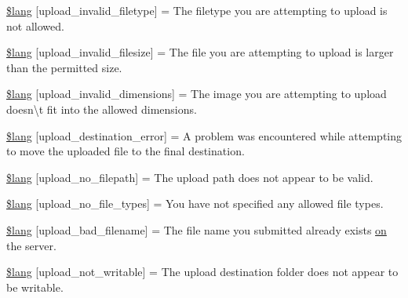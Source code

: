 \begin{DoxyCompactItemize}
\item 
\hyperlink{upload__lang_8php_ac8631aa85ed80396bd78e91a76d5fd38}{\$lang} \mbox{[}\textquotesingle{}upload\+\_\+invalid\+\_\+filetype\textquotesingle{}\mbox{]} = \textquotesingle{}The filetype you are attempting to upload is not allowed.\textquotesingle{}
\item 
\hyperlink{upload__lang_8php_a832b3ec1d84b1d48a488cf525954d8f2}{\$lang} \mbox{[}\textquotesingle{}upload\+\_\+invalid\+\_\+filesize\textquotesingle{}\mbox{]} = \textquotesingle{}The file you are attempting to upload is larger than the permitted size.\textquotesingle{}
\item 
\hyperlink{upload__lang_8php_a4e796eeccf7df90acffea7884a5bd558}{\$lang} \mbox{[}\textquotesingle{}upload\+\_\+invalid\+\_\+dimensions\textquotesingle{}\mbox{]} = \textquotesingle{}The image you are attempting to upload doesn\textbackslash{}\textquotesingle{}t fit into the allowed dimensions.\textquotesingle{}
\item 
\hyperlink{upload__lang_8php_a31be70c748b9bfc43dd7468e1fa64c42}{\$lang} \mbox{[}\textquotesingle{}upload\+\_\+destination\+\_\+error\textquotesingle{}\mbox{]} = \textquotesingle{}A problem was encountered while attempting to move the uploaded file to the final destination.\textquotesingle{}
\item 
\hyperlink{upload__lang_8php_a3c17908c53072c6a5ef593760aaaa704}{\$lang} \mbox{[}\textquotesingle{}upload\+\_\+no\+\_\+filepath\textquotesingle{}\mbox{]} = \textquotesingle{}The upload path does not appear to be valid.\textquotesingle{}
\item 
\hyperlink{upload__lang_8php_ab188c98e583c81905dedaad54ad452bb}{\$lang} \mbox{[}\textquotesingle{}upload\+\_\+no\+\_\+file\+\_\+types\textquotesingle{}\mbox{]} = \textquotesingle{}You have not specified any allowed file types.\textquotesingle{}
\item 
\hyperlink{upload__lang_8php_abb379322384f3f35952a539c63e2c8f7}{\$lang} \mbox{[}\textquotesingle{}upload\+\_\+bad\+\_\+filename\textquotesingle{}\mbox{]} = \textquotesingle{}The file name you submitted already exists \hyperlink{how_to_play_8js_af1f111425a03a603c02a2abf44ad8c43}{on} the server.\textquotesingle{}
\item 
\hyperlink{upload__lang_8php_aed6bfb5a9094179427f61fcbb582145b}{\$lang} \mbox{[}\textquotesingle{}upload\+\_\+not\+\_\+writable\textquotesingle{}\mbox{]} = \textquotesingle{}The upload destination folder does not appear to be writable.\textquotesingle{}
\end{DoxyCompactItemize}


